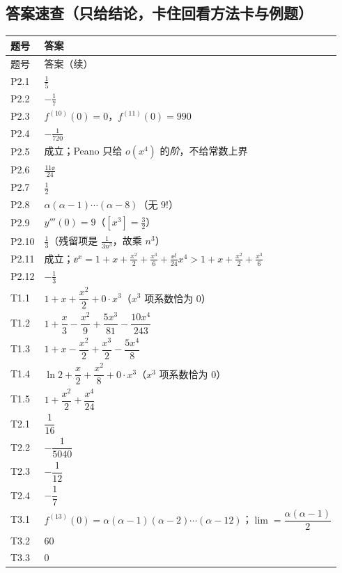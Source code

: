 \documentclass[11pt,a4paper]{ctexart}
\begin{document}
\subsection{答案速查（只给结论，卡住回看方法卡与例题）}
{\footnotesize
\begin{longtable}{@{}p{1.6cm}p{13.0cm}@{}}
\toprule 题号 & 答案 \\ \midrule
\endfirsthead
\toprule 题号 & 答案（续） \\ \midrule
\endhead
\midrule
\endfoot
\bottomrule
\endlastfoot
P2.1 & $\frac{1}{5}$ \\
P2.2 & $-\frac{1}{7}$ \\
P2.3 & $f^{(10)}(0)=0$，$f^{(11)}(0)=990$ \\
P2.4 & $-\frac{1}{720}$ \\
P2.5 & 成立；Peano 只给 $o(x^{4})$ 的\emph{阶}，不给常数上界 \\
P2.6 & $\frac{11\ee}{24}$ \\
P2.7 & $\frac{1}{2}$ \\
P2.8 & $\alpha(\alpha-1)\cdots(\alpha-8)$（无 $9!$） \\
P2.9 & $y'''(0)=9$（$[x^{3}]=\frac{3}{2}$） \\
P2.10 & $\frac{1}{3}$（残留项是 $\frac{1}{3n^{3}}$，故乘 $n^{3}$） \\
P2.11 & 成立；$\ee^{x}=1+x+\frac{x^{2}}{2}+\frac{x^{3}}{6}+\frac{\ee^{\xi}}{24}x^{4}>1+x+\frac{x^{2}}{2}+\frac{x^{3}}{6}$ \\
P2.12 & $-\frac{1}{3}$ \\
T1.1 & $1+x+\dfrac{x^{2}}{2}+0\cdot x^{3}$（$x^{3}$ 项系数恰为 $0$） \\
T1.2 & $1+\dfrac{x}{3}-\dfrac{x^{2}}{9}+\dfrac{5x^{3}}{81}-\dfrac{10x^{4}}{243}$ \\
T1.3 & $1+x-\dfrac{x^{2}}{2}+\dfrac{x^{3}}{2}-\dfrac{5x^{4}}{8}$ \\
T1.4 & $\ln 2+\dfrac{x}{2}+\dfrac{x^{2}}{8}+0\cdot x^{3}$（$x^{3}$ 项系数恰为 $0$） \\
T1.5 & $1+\dfrac{x^{2}}{2}+\dfrac{x^{4}}{24}$ \\
T2.1 & $\dfrac1{16}$ \\
T2.2 & $-\dfrac1{5040}$ \\
T2.3 & $-\dfrac1{12}$ \\
T2.4 & $-\dfrac17$ \\
T3.1 & $f^{(13)}(0)=\alpha(\alpha-1)(\alpha-2)\cdots(\alpha-12)$；$\lim=\dfrac{\alpha(\alpha-1)}{2}$ \\
T3.2 & $60$ \\
T3.3 & $0$ \\

\end{longtable}}
\end{document}
